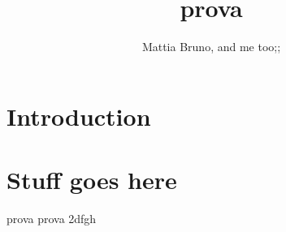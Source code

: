 \documentclass{article}
\title{prova}
\author{Mattia Bruno, and me too;;}
\date{today, \date,}
\begin{document}
\maketitle

\section{Introduction}

\section{Stuff goes here}    
prova
prova 2dfgh
\end{document}
